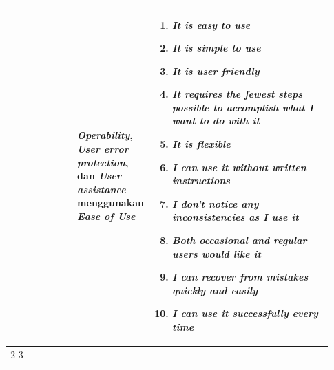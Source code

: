 \begin{longtable}{|p{0.2\linewidth}|p{0.2\linewidth}|p{0.53\linewidth}|}
                                                                  & \textbf{\textit{Operability}}, \textbf{\textit{User error protection}}, dan \textbf{\textit{User assistance}} menggunakan \textbf{\textit{Ease of Use}} & \begin{enumerate}[before=\vspace{-8pt}, leftmargin=*, nosep, series=UEU] \item \textit{It is easy to use} \item \textit{It is simple to use} \item \textit{It is user friendly} \item \textit{It requires the fewest steps possible to accomplish what I want to do with it} \item \textit{It is flexible} \item \textit{I can use it without written instructions} \item \textit{I don't notice any inconsistencies as I use it} \item \textit{Both occasional and regular users would like it} \item \textit{I can recover from mistakes quickly and easily} \item \textit{I can use it successfully every time} \end{enumerate}                                                                                                                                                                                                                                                                                                                                                                                                                                                                                                                                                                                                                                                                                                                                                                                           \\
      \cline{2-3}


\end{longtable}
